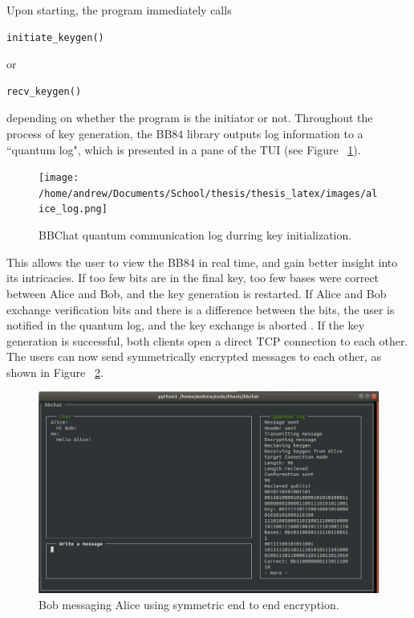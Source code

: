 Upon starting, the program immediately calls 
\begin{verbatim}initiate_keygen()\end{verbatim}
or
 \begin{verbatim}recv_keygen()\end{verbatim}
depending on whether the program is the initiator or not.
Throughout the process of key generation, the BB84 library outputs log information to a ``quantum log", which is presented in a pane of the TUI (see Figure ~\ref{fig:q_log}). 
\begin{figure}[htp]
\centering
\texttt{[image: /home/andrew/Documents/School/thesis/thesis\_latex/images/alice\_log.png]}
\caption{BBChat quantum communication log durring key initialization.}
\label{fig:q_log}
\end{figure}
This allows the user to view the BB84 in real time, and gain better insight into its intricacies.
If too few bits are in the final key, too few bases were correct between Alice and Bob, and the key generation is restarted.
If Alice and Bob exchange verification bits and there is a difference between the bits, the user is notified in the quantum log, and the key exchange is aborted \cite{bbchat}.
If the key generation is successful, both clients open a direct TCP connection to each other.
The users can now send symmetrically encrypted messages to each other, as shown in Figure ~\ref{fig:bob_messaging}. 
\begin{figure}[htp]
\centering
\includegraphics[scale=1.5]{images/bob_messaging.png}
\caption{Bob messaging Alice using symmetric end to end encryption.}
\label{fig:bob_messaging}
\end{figure}

